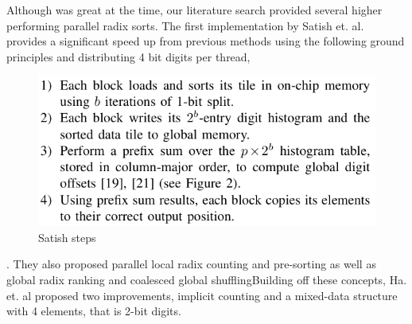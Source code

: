 \documentclass{article}
\begin{document}
Although \citep{zagharadixvector} was great at the time, our literature search provided several higher performing parallel radix sorts. The first implementation by Satish et. al. provides a significant speed up from previous methods using the following ground principles and distributing 4 bit digits per thread, 
\begin{figure} [H]
    \centering
    \includegraphics[width=\linewidth]{report/images/satish.PNG}
    \caption{Satish steps \citep{satish}}
    \label{fig:enter-label}
\end{figure}.
They also proposed parallel local radix counting and pre-sorting as well as global radix ranking and coalesced global shuffling\citep{satish}Building off these concepts, Ha. et. al proposed two improvements, implicit counting and a mixed-data structure with 4 elements, that is 2-bit digits.
\end{document}
